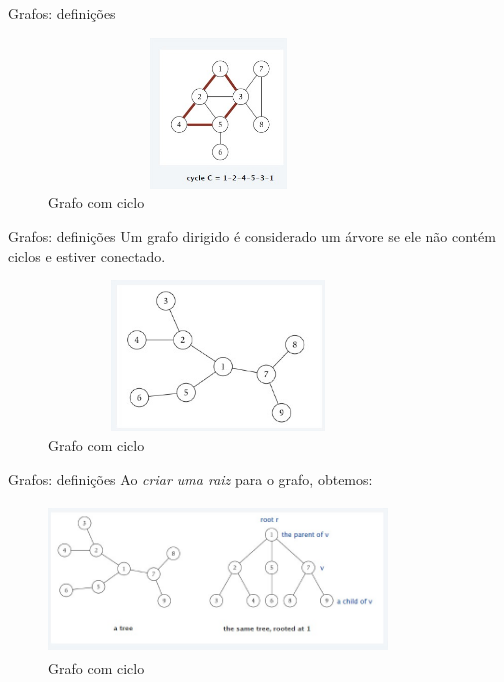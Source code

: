 \begin{frame}
	\begin{block}{Grafos: definições}
		\begin{figure}[!htb]
			\centering	  				
			\includegraphics[height=4cm, width = 9cm]{./pic/ciclo.jpg}
			\caption{Grafo com ciclo \cite{GEEKS_2018}}
		\end{figure}
	\end{block}
\end{frame}

\begin{frame}
	\begin{block}{Grafos: definições}
		Um grafo dirigido é considerado um árvore se ele não contém ciclos e estiver conectado.
		\begin{figure}[!htb]
			\centering	  
			\includegraphics[height=4cm, width = 9cm]{./pic/arvoreGrafo.jpg}
			\caption{Grafo com ciclo \cite{GEEKS_2018}}
		\end{figure}
	\end{block}
\end{frame}

\begin{frame}
	\begin{block}{Grafos: definições}
		Ao \emph{criar uma raiz} para o grafo, obtemos:
		\begin{figure}[!htb]
			\centering	  
			\includegraphics[height=4cm, width = 9cm]{./pic/grafoArvore2.jpg}
			\caption{Grafo com ciclo \cite{GEEKS_2018}}
		\end{figure}
	\end{block}
\end{frame}

